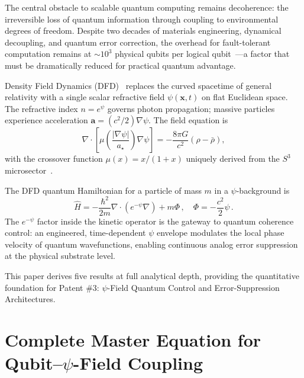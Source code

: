 \documentclass[aps,prl,twocolumn,superscriptaddress,nofootinbib,longbibliography]{revtex4-2}
\begin{document}
The central obstacle to scalable quantum computing remains decoherence:
the irreversible loss of quantum information through coupling to
environmental degrees of freedom. Despite two decades of materials
engineering, dynamical decoupling, and quantum error correction, the
overhead for fault-tolerant computation remains at $\sim 10^3$ physical
qubits per logical qubit~\cite{Fowler2012,Google2023}---a factor that
must be dramatically reduced for practical quantum advantage.

Density Field Dynamics (DFD)~\cite{Alcock2025DFD} replaces the curved
spacetime of general relativity with a single scalar refractive field
$\psi(\mathbf{x},t)$ on flat Euclidean space. The refractive index
$n = e^\psi$ governs photon propagation; massive particles experience
acceleration $\mathbf{a} = (c^2/2)\nabla\psi$. The field equation is
\begin{equation}\label{eq:dfd-field}
\nabla\cdot\!\left[\mu\!\left(\frac{|\nabla\psi|}{a_\star}\right)
\nabla\psi\right] = -\frac{8\pi G}{c^2}(\rho - \bar{\rho}),
\end{equation}
with the crossover function $\mu(x) = x/(1+x)$ uniquely derived from
the $S^3$ microsector~\cite{Alcock2025DFD}.

The DFD quantum Hamiltonian for a particle of mass $m$ in a
$\psi$-background is~\cite{Alcock2025Penrose}
\begin{equation}\label{eq:H-full}
\hat{H} = -\frac{\hbar^2}{2m}\nabla\cdot(e^{-\psi}\nabla)
+ m\Phi\,, \quad \Phi = -\frac{c^2}{2}\psi\,.
\end{equation}
The $e^{-\psi}$ factor inside the kinetic operator is the gateway to
quantum coherence control: an engineered, time-dependent $\psi$ envelope
modulates the local phase velocity of quantum wavefunctions, enabling
continuous analog error suppression at the physical substrate level.

This paper derives five results at full analytical depth, providing the
quantitative foundation for Patent \#3: $\psi$-Field Quantum Control
and Error-Suppression Architectures.

\section{Complete Master Equation for Qubit--$\psi$-Field Coupling}
\label{sec:master}
\end{document}
